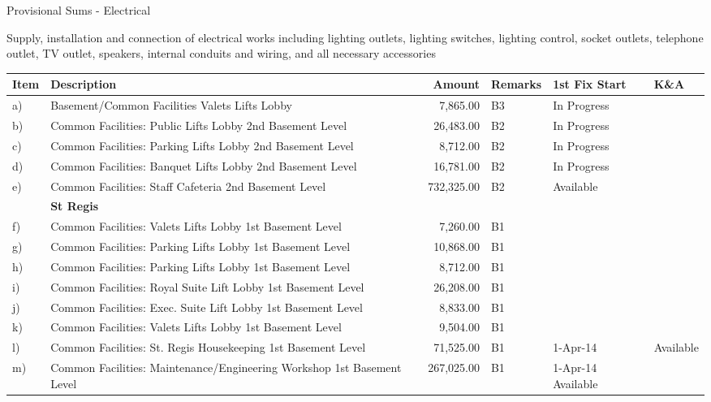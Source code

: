 \documentclass{book}
\begin{document}
Provisional Sums - Electrical
				
Supply, installation and connection of electrical works including lighting outlets, lighting switches, lighting control, socket outlets, telephone outlet, TV outlet, speakers, internal conduits and wiring, and all necessary accessories				

\newenvironment{pstable}{
\raggedright\small
\setcounter{step}{0}
\begin{longtable}{l>{\raggedright}p{3.4cm}rlll}
\toprule
\textbf{Item}	& \textbf{Description}	 &\textbf{Amount}&\textbf{Remarks}	&\textbf{1st Fix Start}
             	&\textbf{K\&A}\\
\midrule}{\bottomrule
\end{longtable}}

\begin{pstable}
a) &Basement/Common Facilities Valets Lifts Lobby 	 &7,865.00 	&B3		&In Progress\\
b) &Common Facilities: Public Lifts Lobby 2nd Basement Level	 &26,483.00 	&B2		&In Progress\\
c) &Common Facilities: Parking Lifts Lobby 2nd Basement Level	 &8,712.00 	&B2		&In Progress\\
d)	&Common Facilities: Banquet Lifts Lobby 2nd Basement Level	 &16,781.00 	&B2		&In Progress\\
e)	&Common Facilities: Staff Cafeteria 2nd Basement Level	 &732,325.00 	&B2		&Available\\
   & \textbf{St Regis}                                              &              &     &\\
f)	&Common Facilities: Valets Lifts Lobby 1st Basement Level	 &7,260.00 	&B1\\
g)	&Common Facilities: Parking Lifts Lobby 1st Basement Level	 &10,868.00 	&B1\\
h)	&Common Facilities: Parking Lifts Lobby 1st Basement Level	 &8,712.00 	&B1\\
i)	&Common Facilities: Royal Suite Lift Lobby 1st Basement Level	 &26,208.00 	&B1\\
j)	&Common Facilities: Exec. Suite Lift Lobby 1st Basement Level	 &8,833.00 	&B1\\
k)	&Common Facilities: Valets Lifts Lobby 1st Basement Level	 &9,504.00 	&B1\\
l)	&Common Facilities: St. Regis Housekeeping 1st Basement Level	 &71,525.00 	&B1 &	1-Apr-14	&Available\\
m)	&Common Facilities: Maintenance/Engineering Workshop 1st Basement Level	 &267,025.00 	&B1	&1-Apr-14	Available\\

\end{pstable}
\end{document}
